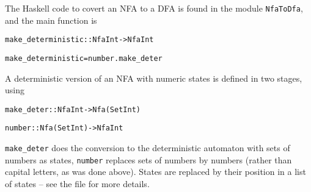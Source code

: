 \documentclass[11pt]{article}
\begin{document}
The Haskell code to covert an NFA to a DFA is found in the module
{\tt NfaToDfa}, and the main function is
\begin{alltt}
make\_deterministic :: Nfa Int -> Nfa Int
 
make\_deterministic = number . make\_deter
\end{alltt}
A deterministic version of an NFA with numeric states is defined in two
stages, using
\begin{alltt}
make\_deter :: Nfa Int -> Nfa (Set Int)
 
number :: Nfa (Set Int) -> Nfa Int
\end{alltt}
{\tt make\_deter} does the conversion to the deterministic automaton with
sets of numbers as states, {\tt number} replaces sets of numbers by numbers
(rather than capital letters, as was done above). States are replaced by their
position in a list of states -- see the file for more details.
\end{document}
